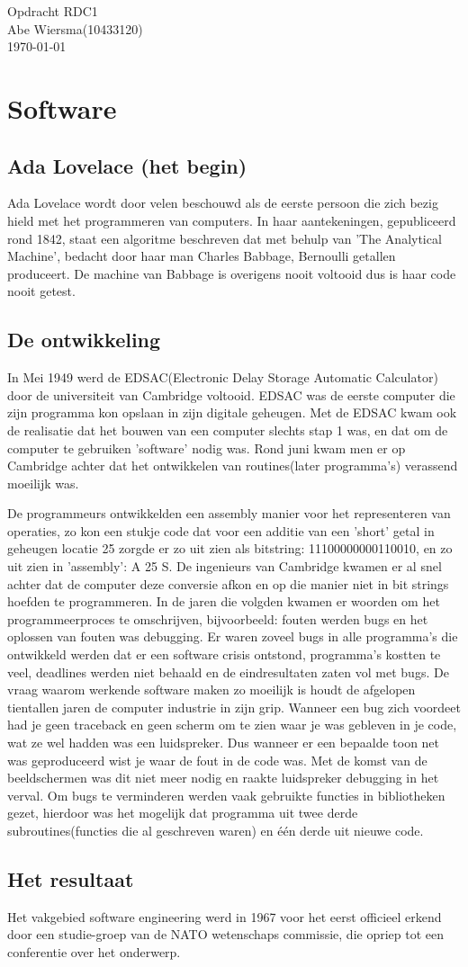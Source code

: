 \documentclass[pdftex,12pt,a4paper]{article}
\begin{document}

\noindent Opdracht RDC1\\ 
Abe Wiersma(10433120)\\
\today
\section*{Software}
\subsection{Ada Lovelace (het begin)}
Ada Lovelace wordt door velen beschouwd als de eerste persoon die zich bezig
hield met het programmeren van computers. In haar aantekeningen, gepubliceerd
rond 1842, staat een algoritme beschreven dat met behulp van
'The Analytical Machine', bedacht door haar man Charles Babbage, Bernoulli
getallen produceert. De machine van Babbage is overigens nooit voltooid dus is
haar code nooit getest.
\subsection{De ontwikkeling}
In Mei 1949 werd de EDSAC(Electronic Delay Storage Automatic Calculator) door
de universiteit van Cambridge voltooid. EDSAC was de eerste computer die zijn
programma kon opslaan in zijn digitale geheugen. Met de EDSAC kwam ook de
realisatie dat het bouwen van een computer slechts stap 1 was, en dat om de
computer te gebruiken 'software' nodig was. Rond juni kwam men er op Cambridge
achter dat het ontwikkelen van routines(later programma's) verassend moeilijk
was. 

De programmeurs ontwikkelden een assembly manier voor het representeren van
operaties, zo kon een stukje code dat voor een additie van een
'short' getal in geheugen locatie 25 zorgde er zo uit zien als bitstring:
11100000000110010, en zo uit zien in 'assembly': A 25 S.\cite{campbell2014history}
De ingenieurs van Cambridge kwamen er al snel achter dat de computer deze
conversie afkon en op die manier niet in bit strings hoefden te programmeren.
In de jaren die volgden kwamen er woorden om het programmeerproces te
omschrijven, bijvoorbeeld: fouten werden bugs en het oplossen van fouten was
debugging. Er waren zoveel bugs in alle programma's die ontwikkeld werden dat
er een software crisis ontstond, programma's kostten te veel, deadlines werden
niet behaald en de eindresultaten zaten vol met bugs. De vraag waarom werkende
software maken zo moeilijk is houdt de afgelopen tientallen jaren de computer
industrie in zijn grip. Wanneer een bug zich voordeet had je geen traceback en
geen scherm om te zien waar je was gebleven in je code, wat ze wel hadden was
een luidspreker. Dus wanneer er een bepaalde toon net was geproduceerd wist je
waar de fout in de code was. Met de komst van de beeldschermen was dit niet meer
nodig en raakte luidspreker debugging in het verval.
Om bugs te verminderen werden vaak gebruikte functies in bibliotheken
gezet, hierdoor was het mogelijk dat programma uit twee derde
subroutines(functies die al geschreven waren) en één derde uit nieuwe code.

\subsection{Het resultaat}
Het vakgebied software engineering werd in 1967 voor het eerst officieel erkend
door een studie-groep van de NATO wetenschaps commissie, die opriep tot een
conferentie over het onderwerp.

\end{document}

